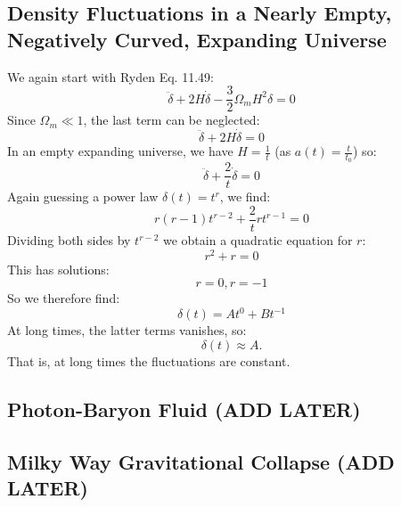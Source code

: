 \subsection{Density Fluctuations in a Nearly Empty, Negatively Curved, Expanding Universe}
We again start with Ryden Eq. 11.49:
\begin{equation}
    \ddot{\delta} + 2H\dot{\delta} - \frac{3}{2}\Omega_m H^2\delta = 0
\end{equation}
Since $\Omega_m \ll 1$, the last term can be neglected:
\begin{equation}
    \ddot{\delta} + 2H\dot{\delta} = 0
\end{equation}
In an empty expanding universe, we have $H = \frac{1}{t}$ (as $a(t) = \frac{t}{t_0}$) so:
\begin{equation}
    \ddot{\delta} + \frac{2}{t}\dot{\delta} = 0
\end{equation}
Again guessing a power law $\delta(t) = t^r$, we find:
\begin{equation}
    r(r-1)t^{r-2} + \frac{2}{t}rt^{r-1} = 0
\end{equation}
Dividing both sides by $t^{r-2}$ we obtain a quadratic equation for $r$:
\begin{equation}
    r^2 + r = 0
\end{equation}
This has solutions:
\begin{equation}
    r = 0, r = -1
\end{equation}
So we therefore find:
\begin{equation}
    \boxed{\delta(t) = At^0 + Bt^{-1}}
\end{equation}
At long times, the latter terms vanishes, so:
\begin{equation}
    \boxed{\delta(t) \approx A}.
\end{equation}
That is, at long times the fluctuations are constant.

\subsection{Photon-Baryon Fluid (ADD LATER)}
\subsection{Milky Way Gravitational Collapse (ADD LATER)}

